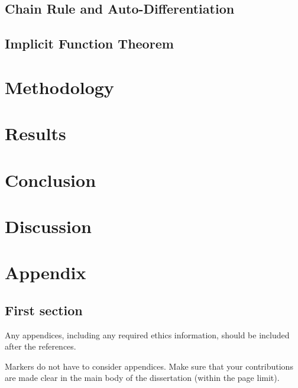 \documentclass[logo,bsc,singlespacing,parskip]{infthesis}
\begin{document}
\section {Chain Rule and Auto-Differentiation}

\section {Implicit Function Theorem}

\chapter{Methodology}

\chapter{Results}

\chapter{Conclusion}

\chapter{Discussion}


% 




\appendix

\chapter{Appendix}

\section{First section}

Any appendices, including any required ethics information, should be included
after the references.

Markers do not have to consider appendices. Make sure that your contributions
are made clear in the main body of the dissertation (within the page limit).
\end{document}
